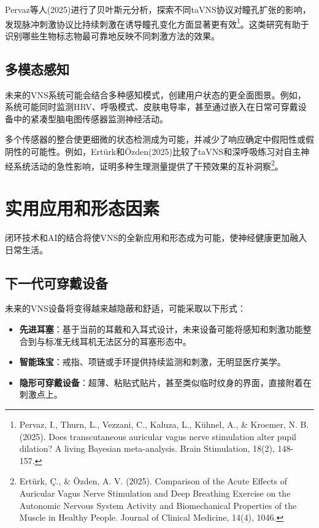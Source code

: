 \documentclass[
  Letterpaper,
]{scrbook}
\providecommand{\tightlist}{%
  \setlength{\itemsep}{0pt}\setlength{\parskip}{0pt}}\usepackage{longtable,booktabs,array}
\begin{document}
Pervaz等人(2025)进行了贝叶斯元分析，探索不同taVNS协议对瞳孔扩张的影响，发现脉冲刺激协议比持续刺激在诱导瞳孔变化方面显著更有效\footnote{Pervaz,
  I., Thurn, L., Vezzani, C., Kaluza, L., Kühnel, A., \& Kroemer, N. B.
  (2025). Does transcutaneous auricular vagus nerve stimulation alter
  pupil dilation? A living Bayesian meta-analysis. Brain Stimulation,
  18(2), 148-157.}。这类研究有助于识别哪些生物标志物最可靠地反映不同刺激方法的效果。

\subsection{多模态感知}\label{ux591aux6a21ux6001ux611fux77e5}

未来的VNS系统可能会结合多种感知模式，创建用户状态的更全面图景。例如，系统可能同时监测HRV、呼吸模式、皮肤电导率，甚至通过嵌入在日常可穿戴设备中的紧凑型脑电图传感器监测神经活动。

多个传感器的整合使更细微的状态检测成为可能，并减少了响应确定中假阳性或假阴性的可能性。例如，Ertürk和Özden(2025)比较了taVNS和深呼吸练习对自主神经系统活动的急性影响，证明多种生理测量提供了干预效果的互补洞察\footnote{Ertürk,
  Ç., \& Özden, A. V. (2025). Comparison of the Acute Effects of
  Auricular Vagus Nerve Stimulation and Deep Breathing Exercise on the
  Autonomic Nervous System Activity and Biomechanical Properties of the
  Muscle in Healthy People. Journal of Clinical Medicine, 14(4), 1046.}。

\section{实用应用和形态因素}\label{ux5b9eux7528ux5e94ux7528ux548cux5f62ux6001ux56e0ux7d20}

闭环技术和AI的结合将使VNS的全新应用和形态成为可能，使神经健康更加融入日常生活。

\subsection{下一代可穿戴设备}\label{ux4e0bux4e00ux4ee3ux53efux7a7fux6234ux8bbeux5907}

未来的VNS设备将变得越来越隐蔽和舒适，可能采取以下形式：

\begin{itemize}
\tightlist
\item
  \textbf{先进耳塞}：基于当前的耳戴和入耳式设计，未来设备可能将感知和刺激功能整合到与标准无线耳机无法区分的耳塞形态中。
\item
  \textbf{智能珠宝}：戒指、项链或手环提供持续监测和刺激，无明显医疗美学。
\item
  \textbf{隐形可穿戴设备}：超薄、粘贴式贴片，甚至类似临时纹身的界面，直接附着在刺激点上。
\end{itemize}
\end{document}
